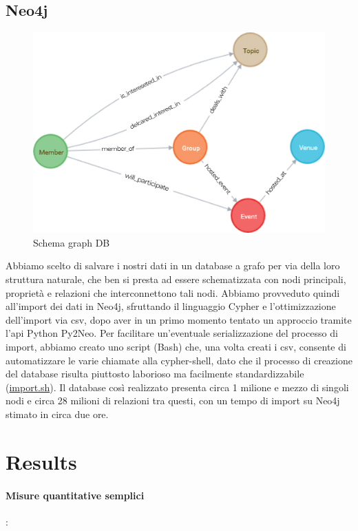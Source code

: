 \documentclass[fleqn,10pt]{SelfArx} %
\begin{document}
{\subsection{Neo4j}%
\begin{figure}
\centering
\includegraphics[scale=0.57]{graph.png}
\caption{\label{graph_neo4j} Schema graph DB}
\end{figure}
Abbiamo scelto di salvare i nostri dati in un database a grafo per via della loro struttura naturale, che ben si presta ad essere schematizzata con nodi principali, proprietà e relazioni che interconnettono tali nodi. Abbiamo provveduto quindi all'import dei dati in Neo4j, sfruttando il linguaggio Cypher e l'ottimizzazione dell'import via csv, dopo aver in un primo momento tentato un approccio tramite l'api Python Py2Neo. Per facilitare un'eventuale serializzazione del processo di import, abbiamo creato uno script (Bash) che, una volta creati i csv, consente di automatizzare le varie chiamate alla cypher-shell, dato che il processo di creazione del database risulta piuttosto laborioso ma facilmente standardizzabile (\href{https://github.com/DBertazioli/NeoMeetup/blob/master/Scripts/import_cypher.sh}{import.sh}). Il database così realizzato presenta circa 1 milione e mezzo di singoli nodi e circa 28 milioni di relazioni tra questi, con un tempo di import su Neo4j stimato in circa due ore.
}
\section{Results}
\paragraph{Misure quantitative semplici}:
\end{document}
